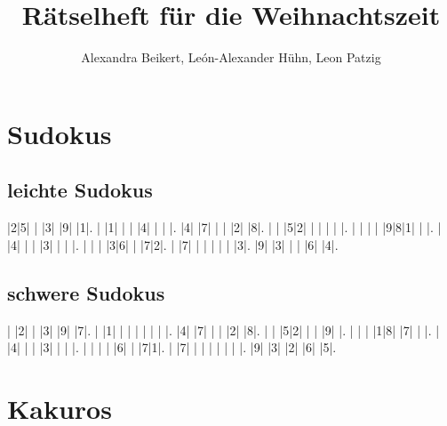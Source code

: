 \documentclass{scrartcl}
\begin{document}
\title{\Large
	Rätselheft für die Weihnachtszeit
}
\author{Alexandra Beikert, León-Alexander Hühn, Leon Patzig}
\extratitle{\centering Rätseln}



\maketitle
\newpage
\tableofcontents
\newpage

\section{Sudokus}
\subsection{leichte Sudokus}


\begin{sudoku}
|2|5| | |3| |9| |1|.
| |1| | | |4| | | |.
|4| |7| | | |2| |8|.
| | |5|2| | | | | |.
| | | | |9|8|1| | |.
| |4| | | |3| | | |.
| | | |3|6| | |7|2|.
| |7| | | | | | |3|.
|9| |3| | | |6| |4|.
\end{sudoku}

\subsection{schwere Sudokus}
\begin{sudoku}
| |2| | |3| |9| |7|.
| |1| | | | | | | |.
|4| |7| | | |2| |8|.
| | |5|2| | | |9| |.
| | | |1|8| |7| | |.
| |4| | | |3| | | |.
| | | | |6| | |7|1|.
| |7| | | | | | | |.
|9| |3| |2| |6| |5|.
\end{sudoku}

\section{Kakuros}

\begin{kakuro}
    \framepuzzle
  \end{kakuro}
\end{document}
